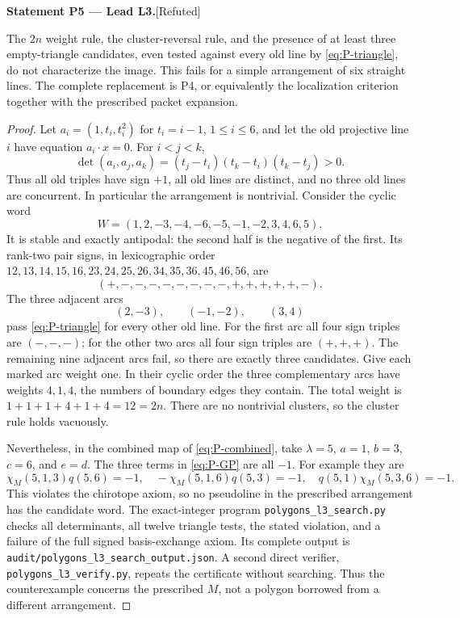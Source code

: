 \documentclass[11pt,a4paper]{article}
\newenvironment{resultenv}[3]{\par\medskip\phantomsection\label{#1}\noindent\textbf{Statement #1 --- #3.}\quad\textsf{[#2]}\par\smallskip\noindent\ignorespaces}{\par\medskip}
\begin{document}
\begin{resultenv}{P5}{Refuted}{Lead L3}
The $2n$ weight rule, the cluster-reversal rule, and the presence of at
least three empty-triangle candidates, even tested against every old
line by \eqref{eq:P-triangle}, do not characterize the image.  This
fails for a simple arrangement of six straight lines.  The complete
replacement is P4, or equivalently the localization criterion together
with the prescribed packet expansion.
\end{resultenv}

\begin{proof}
Let $a_i=(1,t_i,t_i^2)$ for $t_i=i-1$, $1\le i\le6$, and let the old
projective line $i$ have equation $a_i\cdot x=0$.  For $i<j<k$,
\[
 \det(a_i,a_j,a_k)=(t_j-t_i)(t_k-t_i)(t_k-t_j)>0.
\]
Thus all old triples have sign $+1$, all old lines are distinct, and
no three old lines are concurrent.  In particular the arrangement is
nontrivial.  Consider the cyclic word
\[
 W=(1,2,-3,-4,-6,-5,-1,-2,3,4,6,5).
\]
It is stable and exactly antipodal: the second half is the negative of
the first.  Its rank-two pair signs, in lexicographic order
$12,13,14,15,16,23,24,25,26,34,35,36,45,46,56$, are
\[
 (+,-,-,-,-,-,-,-,-,+,+,+,+,+,-).
\]
The three adjacent arcs
\[
                (2,-3),\qquad(-1,-2),\qquad(3,4)
\]
pass \eqref{eq:P-triangle} for every other old line.  For the first
arc all four sign triples are $(-,-,-)$; for the other two arcs all
four sign triples are $(+,+,+)$.  The remaining nine adjacent arcs
fail, so there are exactly three candidates.  Give each marked arc
weight one.  In their cyclic order the three complementary arcs have
weights $4,1,4$, the numbers of boundary edges they contain.  The
total weight is $1+1+1+4+1+4=12=2n$.  There are no nontrivial clusters,
so the cluster rule holds vacuously.

Nevertheless, in the combined map of \eqref{eq:P-combined}, take
$\lambda=5$, $a=1$, $b=3$, $c=6$, and $e=d$.  The three terms in
\eqref{eq:P-GP} are all $-1$.  For example they are
\[
 \chi_M(5,1,3)q(5,6)=-1,\quad
 -\chi_M(5,1,6)q(5,3)=-1,\quad
 q(5,1)\chi_M(5,3,6)=-1.
\]
This violates the chirotope axiom, so no pseudoline in the prescribed
arrangement has the candidate word.  The exact-integer program
\texttt{polygons\_l3\_search.py} checks all determinants, all twelve
triangle tests, the stated violation, and a failure of the full signed
basis-exchange axiom.  Its complete output is
\texttt{audit/polygons\_l3\_search\_output.json}.  A second direct
verifier, \texttt{polygons\_l3\_verify.py}, repeats the certificate
without searching.  Thus the counterexample concerns the prescribed
$M$, not a polygon borrowed from a different arrangement.
\end{proof}
\end{document}
